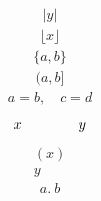 \documentclass{article}
\begin{document}
\[\begin{gathered}|y|\end{gathered}\]
\[\begin{gathered}\lfloor x\rfloor\end{gathered}\]
\[\begin{gathered}\{a,b\}\end{gathered}\]
\[\begin{gathered}(a,b]\end{gathered}\]
\[\begin{gathered}a=b,\quad c=d\end{gathered}\]
\[x\hphantom{abcdefgh}y\]
\[\begin{gathered}(\!x)\\ \!y\end{gathered}\]
\[\begin{gathered}a.\ b\end{gathered}\]
\end{document}
